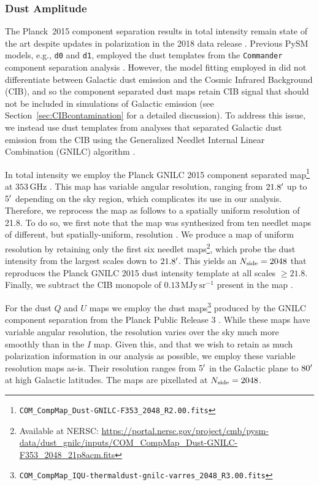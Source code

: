 \documentclass[twocolumn]{aastex631}
\begin{document}
\subsubsection{Dust Amplitude}\label{sec:dustamplitude}
The Planck~2015 component separation results in total intensity remain state of the art despite updates in polarization in the 2018 data release \citep{planck2016-l04}. Previous PySM models, e.g., \texttt{d0} and \texttt{d1}, employed the dust templates from the \texttt{Commander} component separation analysis \citep{planck2014-a11}. However, the model fitting employed in \citet{planck2014-a11} did not differentiate between Galactic dust emission and the Cosmic Infrared Background (CIB), and so the component separated dust maps retain CIB signal that should not be included in simulations of Galactic emission (see Section~\ref{sec:CIBcontamination} for a detailed discussion). To address this issue, we instead use dust templates from analyses that separated Galactic dust emission from the CIB using the Generalized Needlet Internal Linear Combination (GNILC) algorithm \citep{Remazeilles:2011}. 

In total intensity we employ the Planck GNILC 2015 component separated map\footnote{\texttt{COM\_CompMap\_Dust-GNILC-F353\_2048\_R2.00.fits}} at $353$\,GHz \citep{planck2016-XLVIII}. This map has variable angular resolution, ranging from $21.8\mbox{$^\prime$}$ up to $5\mbox{$^\prime$}$ depending on the sky region, which complicates its use in our analysis. Therefore, we reprocess the map as follows to a spatially uniform resolution of 21.8\arcmin. To do so, we first note that the map was synthesized from ten needlet maps of different, but spatially-uniform, resolution \citep[][Figure~A.2]{planck2016-l04}. We produce a map of uniform resolution by retaining only the first six needlet maps\footnote{Available at NERSC: \url{https://portal.nersc.gov/project/cmb/pysm-data/dust_gnilc/inputs/COM_CompMap_Dust-GNILC-F353_2048_21p8acm.fits}}, which probe the dust intensity from the largest scales down to $21.8\mbox{$^\prime$}$. This yields an $N_{\rm side} = 2048$ that reproduces the Planck GNILC 2015 dust intensity template at all scales $\geq 21.8$\arcmin. Finally, we subtract the CIB monopole of $0.13\, \text{MJy}\,\text{sr}^{-1}$ present in the map \citep[][Section~2.2]{planck2016-l11B}.

For the dust $Q$ and $U$ maps we employ the dust maps\footnote{\texttt{COM\_CompMap\_IQU-thermaldust-gnilc-varres\_2048\_R3.00.fits}} produced by the GNILC component separation from the Planck Public Release 3 \citep{planck2016-l04,planck2016-l11B}. While these maps have variable angular resolution, the resolution varies over the sky much more smoothly than in the $I$ map. Given this, and that we wish to retain as much polarization information in our analysis as possible, we employ these variable resolution maps as-is. Their resolution ranges from $5\mbox{$^\prime$}$ in the Galactic plane to $80\mbox{$^\prime$}$ at high Galactic latitudes. The maps are pixellated at $N_{\rm side} = 2048$. 
\end{document}
